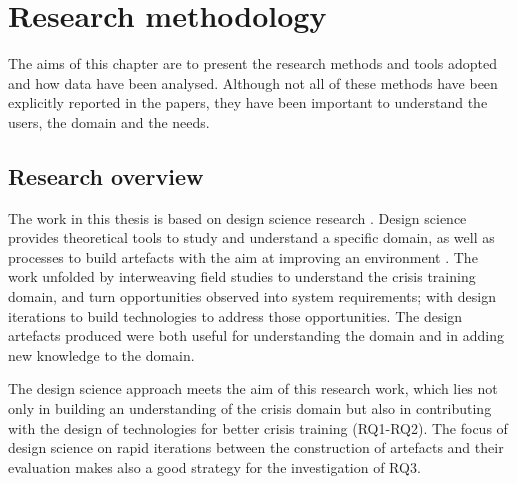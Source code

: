 \chapter{Research methodology}\label{research}


The aims of this chapter are to present the research methods and tools adopted and how data have been analysed. Although not all of these methods have been explicitly reported in the papers, they have been important to understand the users, the domain and the needs.

\section{Research overview}\label{research-overview}

The work in this thesis is based on design science research \autocites{Hevner:2010fy}{March:1995gm}. Design science provides theoretical tools to study and understand a specific domain, as well as processes to build artefacts with the aim at improving an environment \autocite{simon1996sciences}. The work unfolded by interweaving field studies to understand the crisis training domain, and turn opportunities observed into system requirements; with design iterations to build technologies to address those opportunities. The design artefacts produced were both useful for understanding the domain and in adding new knowledge to the domain.

The design science approach meets the aim of this research work, which lies not only in building an understanding of the crisis domain but also in contributing with the design of technologies for better crisis training (RQ1-RQ2). The focus of design science on rapid iterations between the construction of artefacts and their evaluation \autocite{Hevner:2010gc} makes also a good strategy for the investigation of RQ3.

